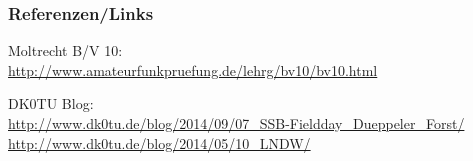 \renewcommand{\refname}{Referenzen}

\begin{frame}
    \frametitle{Referenzen/Links}
    \hypertarget{refs}{}
    \footnotesize

    \begin{thebibliography}{}
         Moltrecht B/V 10: \\
                        \url{http://www.amateurfunkpruefung.de/lehrg/bv10/bv10.html}

          DK0TU Blog: \\
                        \url{http://www.dk0tu.de/blog/2014/09/07_SSB-Fieldday_Dueppeler_Forst/}
                        \url{http://www.dk0tu.de/blog/2014/05/10_LNDW/}
    \end{thebibliography} 
   
\end{frame}



